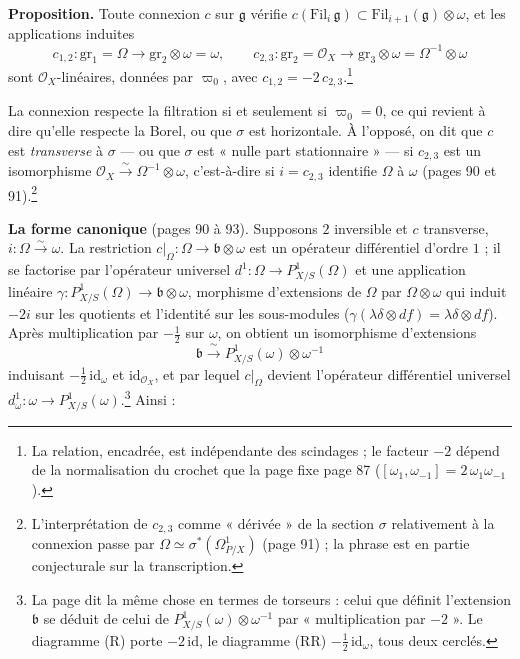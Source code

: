 \documentclass[11pt,a4paper]{article}
\begin{document}
\textbf{Proposition.} Toute connexion $c$ sur $\mathfrak{g}$ vérifie
$c(\mathrm{Fil}_i\,\mathfrak{g}) \subset \mathrm{Fil}_{i+1}(\mathfrak{g}) \otimes
\omega$, et les applications induites
\[
  c_{1,2} : \mathrm{gr}_1 = \Omega \to \mathrm{gr}_2 \otimes \omega = \omega, \qquad
  c_{2,3} : \mathrm{gr}_2 = \mathcal{O}_X \to \mathrm{gr}_3 \otimes \omega =
  \Omega^{-1} \otimes \omega
\]
sont $\mathcal{O}_X$-linéaires, données par $\varpi_0$, avec
$c_{1,2} = -2\,c_{2,3}$.\footnote{La relation, encadrée, est indépendante des
scindages ; le facteur $-2$ dépend de la normalisation du crochet que la
page fixe page 87 ($[\omega_1, \omega_{-1}] = 2\,\omega_1\omega_{-1}$).}

La connexion respecte la filtration si et seulement si $\varpi_0 = 0$, ce
qui revient à dire qu'elle respecte la Borel, ou que $\sigma$ est
horizontale. À l'opposé, on dit que $c$ est \emph{transverse} à $\sigma$ — ou
que $\sigma$ est « nulle part stationnaire » — si $c_{2,3}$ est un
isomorphisme $\mathcal{O}_X \xrightarrow{\sim} \Omega^{-1} \otimes \omega$,
c'est-à-dire si $i = c_{2,3}$ identifie $\Omega$ à $\omega$ (pages 90 et
91).\footnote{L'interprétation de $c_{2,3}$ comme « dérivée » de la section
$\sigma$ relativement à la connexion passe par $\Omega \simeq
\sigma^*(\Omega^1_{P/X})$ (page 91) ; la phrase est en partie conjecturale
sur la transcription.}

\textbf{La forme canonique} (pages 90 à 93). Supposons $2$ inversible et $c$
transverse, $i : \Omega \xrightarrow{\sim} \omega$. La restriction
$c|_\Omega : \Omega \to \mathfrak{b} \otimes \omega$ est un opérateur
différentiel d'ordre $1$ ; il se factorise par l'opérateur universel
$d^1 : \Omega \to P^1_{X/S}(\Omega)$ et une application linéaire
$\gamma : P^1_{X/S}(\Omega) \to \mathfrak{b} \otimes \omega$, morphisme
d'extensions de $\Omega$ par $\Omega \otimes \omega$ qui induit $-2i$ sur les
quotients et l'identité sur les sous-modules ($\gamma(\lambda\delta \otimes df)
= \lambda\delta \otimes df$). Après multiplication par $-\frac12$ sur $\omega$,
on obtient un isomorphisme d'extensions
\[
  \mathfrak{b} \xrightarrow{\ \sim\ } P^1_{X/S}(\omega) \otimes \omega^{-1}
\]
induisant $-\frac12\,\mathrm{id}_\omega$ et $\mathrm{id}_{\mathcal{O}_X}$, et par lequel
$c|_\Omega$ devient l'opérateur différentiel universel
$d^1_{\omega} : \omega \to P^1_{X/S}(\omega)$.\footnote{La page dit la même
chose en termes de torseurs : celui que définit l'extension $\mathfrak{b}$ se
déduit de celui de $P^1_{X/S}(\omega) \otimes \omega^{-1}$ par
« multiplication par $-2$ ». Le diagramme (R) porte $-2\,\mathrm{id}$, le
diagramme (RR) $-\frac12\,\mathrm{id}_\omega$, tous deux cerclés.} Ainsi :
\end{document}

